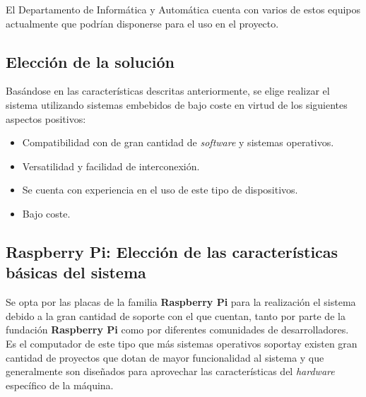 El Departamento de Informática y Automática cuenta con varios de estos equipos actualmente que podrían disponerse para el uso en el proyecto.

\subsection{Elección de la solución}

Basándose en las características descritas anteriormente, se elige realizar el sistema utilizando sistemas embebidos de bajo coste en virtud de los siguientes aspectos positivos:

\begin{itemize}
\item Compatibilidad con de gran cantidad de \textit{software} y sistemas operativos.
\item Versatilidad y facilidad de interconexión.
\item Se cuenta con experiencia en el uso de este tipo de dispositivos.
\item Bajo coste.
\end{itemize}


\subsection{Raspberry Pi: Elección de las características básicas del sistema}

Se opta por las placas de la familia \textbf{Raspberry Pi} para la realización el sistema debido a la gran cantidad de soporte con el que cuentan, tanto por parte de la fundación \textbf{Raspberry Pi} como por diferentes comunidades de desarrolladores. Es el computador de este tipo que más sistemas operativos soporta y existen gran cantidad de proyectos que dotan de mayor funcionalidad al sistema y que generalmente son diseñados para aprovechar las características del \textit{hardware} específico de la máquina.

